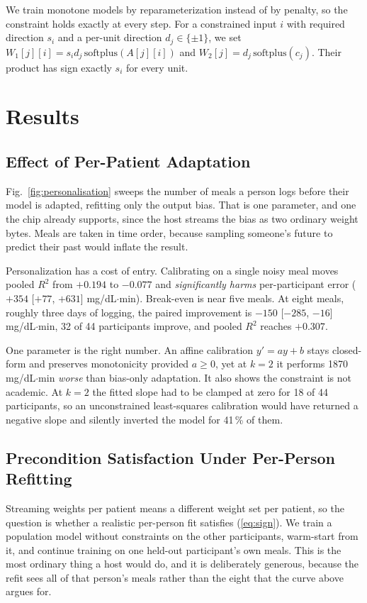 \documentclass[conference]{IEEEtran}
\begin{document}
We train monotone models by reparameterization instead of by penalty, so the
constraint holds exactly at every step. For a constrained input $i$ with
required direction $s_i$ and a per-unit direction $d_j \in \{\pm 1\}$, we set
$W_1[j][i] = s_i d_j\,\mathrm{softplus}(A[j][i])$ and
$W_2[j] = d_j\,\mathrm{softplus}(c_j)$. Their product has sign exactly $s_i$
for every unit.

\section{Results}
\label{sec:results}

\subsection{Effect of Per-Patient Adaptation}

Fig.~\ref{fig:personalisation} sweeps the number of meals a person logs before
their model is adapted, refitting only the output bias. That is one parameter,
and one the chip already supports, since the host streams the bias as two
ordinary weight bytes. Meals are taken in time order, because sampling
someone's future to predict their past would inflate the result.

Personalization has a cost of entry. Calibrating on a single noisy meal moves
pooled $R^2$ from $+0.194$ to $-0.077$ and \emph{significantly harms}
per-participant error ($+354$ [$+77$, $+631$] mg/dL$\cdot$min). Break-even is
near five meals. At eight meals, roughly three days of logging, the paired
improvement is $-150$ [$-285$, $-16$] mg/dL$\cdot$min, 32 of 44 participants
improve, and pooled $R^2$ reaches $+0.307$.

One parameter is the right number. An affine calibration $y' = ay + b$ stays
closed-form and preserves monotonicity provided $a \geq 0$, yet at $k=2$ it
performs 1870 mg/dL$\cdot$min \emph{worse} than bias-only adaptation. It also
shows the constraint is not academic. At $k=2$ the fitted slope had to be
clamped at zero for 18 of 44 participants, so an unconstrained least-squares
calibration would have returned a negative slope and silently inverted the
model for 41\,\% of them.

\subsection{Precondition Satisfaction Under Per-Person Refitting}

Streaming weights per patient means a different weight set per patient, so the
question is whether a realistic per-person fit satisfies (\ref{eq:sign}). We
train a population model without constraints on the other participants,
warm-start from it, and continue training on one held-out participant's own
meals. This is the most ordinary thing a host would do, and it is deliberately
generous, because the refit sees all of that person's meals rather than the
eight that the curve above argues for.
\end{document}
